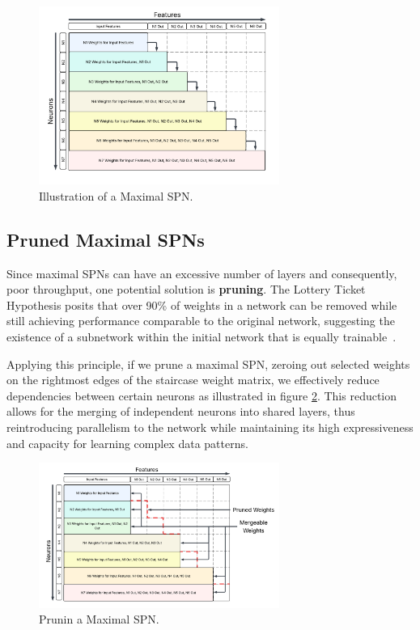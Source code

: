 \begin{figure}[h!]
\centering
\includegraphics[width=0.7\textwidth]{Figures/Methodology/Neuron_Based_Maximal_SPN_Weights.png}
\caption{Illustration of a Maximal SPN.}
\label{fig:maxSpn}
\end{figure}


\subsection{Pruned Maximal SPNs}

Since maximal SPNs can have an excessive number of layers and consequently, poor throughput, one potential solution is \textbf{pruning}. The Lottery Ticket Hypothesis posits that over 90\% of weights in a network can be removed while still achieving performance comparable to the original network, suggesting the existence of a subnetwork within the initial network that is equally trainable~\cite{frankle2018lottery}.

Applying this principle, if we prune a maximal SPN, zeroing out selected weights on the rightmost edges of the staircase weight matrix, we effectively reduce dependencies between certain neurons as illustrated in figure \ref{fig:pruningMaxSPN}. This reduction allows for the merging of independent neurons into shared layers, thus reintroducing parallelism to the network while maintaining its high expressiveness and capacity for learning complex data patterns.

\begin{figure}[h!]
\centering
\includegraphics[width=0.7\textwidth]{Figures/Methodology/pruning_max_spn.png}
\caption{Prunin a Maximal SPN.}
\label{fig:pruningMaxSPN}
\end{figure}

